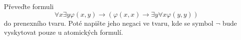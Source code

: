 Převeďte formuli
$$\forall x \exists y \varphi (x,y) \rightarrow ( \varphi (x,x) \rightarrow
\exists y \forall x \varphi (y,y))$$
do prenexního tvaru. Poté napište jeho negaci ve tvaru, kde se symbol $\neg$
  bude vyskytovat pouze u atomických formulí.
